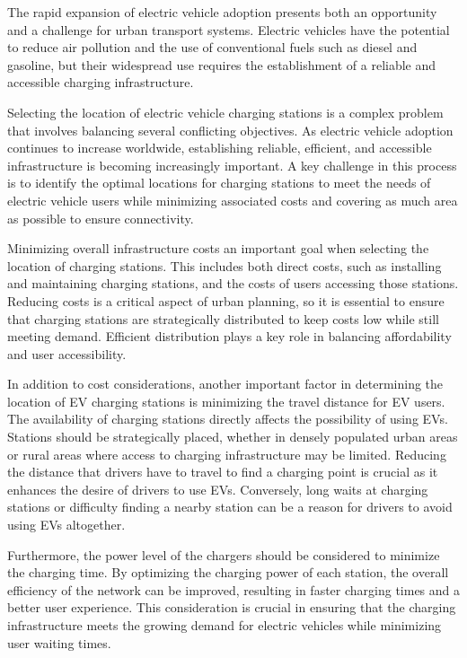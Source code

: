 The rapid expansion of electric vehicle adoption presents both an opportunity and a challenge for urban transport systems. Electric vehicles have the potential to reduce air pollution and the use of conventional fuels such as diesel and gasoline, but their widespread use requires the establishment of a reliable and accessible charging infrastructure.

Selecting the location of electric vehicle charging stations is a complex problem that involves balancing several conflicting objectives. As electric vehicle adoption continues to increase worldwide, establishing reliable, efficient, and accessible infrastructure is becoming increasingly important. A key challenge in this process is to identify the optimal locations for charging stations to meet the needs of electric vehicle users while minimizing associated costs and covering as much area as possible to ensure connectivity.

Minimizing overall infrastructure costs an important goal when selecting the location of charging stations. This includes both direct costs, such as installing and maintaining charging stations, and the costs of users accessing those stations. Reducing costs is a critical aspect of urban planning, so it is essential to ensure that charging stations are strategically distributed to keep costs low while still meeting demand. Efficient distribution plays a key role in balancing affordability and user accessibility.

In addition to cost considerations, another important factor in determining the location of EV charging stations is minimizing the travel distance for EV users. The availability of charging stations directly affects the possibility of using EVs. Stations should be strategically placed, whether in densely populated urban areas or rural areas where access to charging infrastructure may be limited. Reducing the distance that drivers have to travel to find a charging point is crucial as it enhances the desire of drivers to use EVs. Conversely, long waits at charging stations or difficulty finding a nearby station can be a reason for drivers to avoid using EVs altogether.

Furthermore, the power level of the chargers should be considered to minimize the charging time. By optimizing the charging power of each station, the overall efficiency of the network can be improved, resulting in faster charging times and a better user experience. This consideration is crucial in ensuring that the charging infrastructure meets the growing demand for electric vehicles while minimizing user waiting times.

